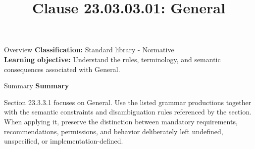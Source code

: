 \documentclass[10pt,letterpaper]{article}
\title{Clause 23.03.03.01: General}
\author{}
\date{}
\begin{document}
\maketitle
\begin{CornellOverviewBox}{Overview}
\textbf{Classification:} Standard library - Normative\\[2pt]
\textbf{Learning objective:} Understand the rules, terminology, and semantic consequences associated with General.
\end{CornellOverviewBox}\begin{CornellSummaryBox}{Summary}
{\sffamily\bfseries\color{Accent} Summary}\par\vspace{3pt}Section 23.3.3.1 focuses on General. Use the listed grammar productions together with the semantic constraints and disambiguation rules referenced by the section. When applying it, preserve the distinction between mandatory requirements, recommendations, permissions, and behavior deliberately left undefined, unspecified, or implementation-defined.
\end{CornellSummaryBox}
\end{document}
